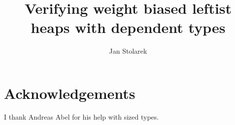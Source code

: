 \documentclass[draft]{llncs}
\begin{document}
\title{Verifying weight biased leftist heaps with dependent types}
\author{Jan Stolarek}



\maketitle







\section*{Acknowledgements}

I thank Andreas Abel for his help with sized types.


\end{document}
